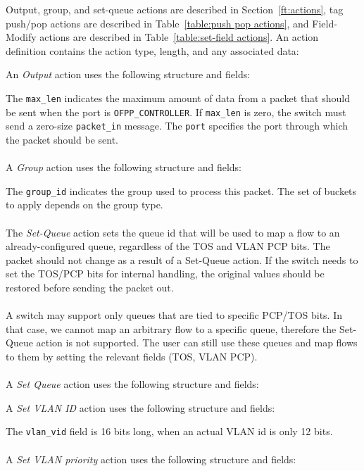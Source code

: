  
Output, group, and set-queue actions are described in Section~\ref{ft:actions}, tag push/pop actions are described in Table~\ref{table:push pop actions}, and Field-Modify actions are described in Table~\ref{table:set-field actions}.  An action definition contains the action type, length, and any associated data:


An \emph{Output} action uses the following structure and fields:


The \verb|max_len| indicates the maximum amount of data from a packet that should be sent when the port is \verb|OFPP_CONTROLLER|.  If \verb|max_len| is zero, the switch must send a zero-size \verb|packet_in| message.  The \verb|port| specifies the port through which the packet should be sent.
\\\\
A \emph{Group} action uses the following structure and fields:


The \verb|group_id| indicates the group used to process this packet.  The set of buckets to apply depends on the group type.
\\\\
The \emph{Set-Queue} action sets the queue id that will be used to map a flow to an already-configured queue, regardless of the TOS and VLAN PCP bits. The packet should not change as a result of a Set-Queue action. If the switch needs to set the TOS/PCP bits for internal handling, the original values should be restored before sending the packet out.
\\\\
A switch may support only queues that are tied to specific PCP/TOS bits. In that case, we cannot map an arbitrary flow to a specific queue, therefore the Set-Queue action is not supported. The user can still use these queues and map flows to them by setting the relevant fields (TOS, VLAN PCP).
\\\\
A \emph{Set Queue} action uses the following structure and fields:


A \emph{Set VLAN ID} action uses the following structure and fields:


The \verb|vlan_vid| field is 16 bits long, when an actual VLAN id is only 12 bits.
\\\\
A \emph{Set VLAN priority} action uses the following structure and fields:

